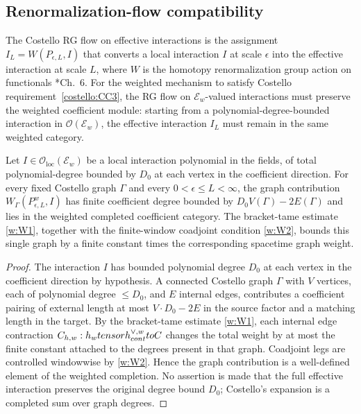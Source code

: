\subsection*{Renormalization-flow compatibility}

The Costello RG flow on effective interactions is the assignment
$I_L=W(P_{\epsilon,L},I)$ that converts a local interaction $I$ at scale
$\epsilon$ into the effective interaction at scale $L$, where $W$ is
the homotopy renormalization group action on functionals
\cite{costello-renormalization}*{Ch.~6}. For the weighted mechanism to
satisfy Costello requirement~\ref{costello:CC3}, the RG flow on
$\mathcal E_w$-valued interactions must preserve the weighted
coefficient module: starting from a polynomial-degree-bounded
interaction in $\mathcal O(\mathcal E_w)$, the effective interaction
$I_L$ must remain in the same weighted category.

\begin{prop}\label{prop:wt-rg-tame}
  Let $I\in\mathcal O_{\mathrm{loc}}(\mathcal E_w)$ be a local
  interaction polynomial in the fields, of total polynomial-degree
  bounded by $D_0$ at each vertex in the coefficient direction.  For
  every fixed Costello graph $\Gamma$ and every
  $0<\epsilon\leq L<\infty$, the graph contribution
  $W_\Gamma(P_{\epsilon,L}^{w},I)$ has finite coefficient degree
  bounded by $D_0V(\Gamma)-2E(\Gamma)$ and lies in the weighted
  completed coefficient category.  The bracket-tame estimate
  \ref{w:W1}, together with the finite-window coadjoint condition
  \ref{w:W2}, bounds this single graph by a finite constant times the
  corresponding spacetime graph weight.
\end{prop}

\begin{proof}
  The interaction $I$ has bounded polynomial degree $D_0$ at each
  vertex in the coefficient direction by hypothesis. A connected Costello graph
  $\Gamma$ with $V$ vertices, each of polynomial degree $\leq D_0$,
  and $E$ internal edges, contributes a coefficient
  pairing of external length at most $V\cdot D_0-2E$ in the source
  factor and a matching length in the target. By the bracket-tame
  estimate \ref{w:W1}, each internal edge contraction
  $C_{h,w}:
  h_wtensorh^{\vee,w}_{cont}toC$
  changes the total weight by at most the finite constant attached to
  the degrees present in that graph.  Coadjoint legs are controlled
  windowwise by \ref{w:W2}.  Hence the graph contribution is a
  well-defined element of the weighted completion.  No assertion is
  made that the full effective interaction preserves the original
  degree bound $D_0$; Costello's expansion is a completed sum over
  graph degrees.
\end{proof}

